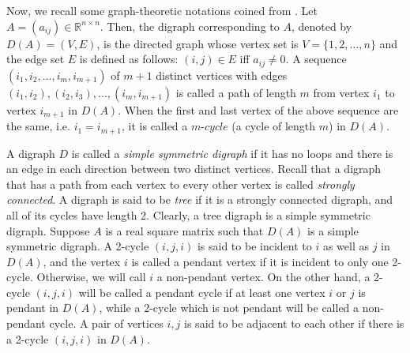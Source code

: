 \documentclass[notitlepage,12pt,reqno]{amsart}
\numberwithin{equation}{section}
\begin{document}
Now, we recall some graph-theoretic notations coined from \cite{cov}. Let $A=(a_{ij})\in \mathbb{R}^{n\times n}$. Then, the digraph corresponding to $A$, denoted by $D(A)=(V,E)$, is the directed graph whose vertex set is $V=\{1,2, \ldots ,n\}$ and the edge set $E$ is defined as follows: $(i,j)\in E$ iff $a_{ij}\neq 0$. A sequence $(i_1,i_2,\ldots ,i_m,i_{m+1})$ of $m+1$ distinct vertices with edges $(i_1,i_2),(i_2,i_3),\ldots ,(i_m,i_{m+1})$ is called a path of length $m$ from vertex $i_1$ to vertex $i_{m+1}$ in $D(A)$. When the first and last vertex of the above sequence are the same, i.e. $i_1=i_{m+1}$, it is called a $m$-$cycle$ (a cycle of length $m$) in $D(A)$. 

A digraph $D$ is called a {\it simple symmetric digraph} if it has no loops and there is an edge in each direction between two distinct vertices. Recall that a digraph that has a path from each vertex to every other vertex is called {\it strongly connected}. A digraph is said to be {\it tree} if it is a strongly connected digraph, and all of its cycles have length 2. Clearly, a tree digraph is a simple symmetric digraph. Suppose $A$ is a real square matrix such that $D(A)$ is a simple symmetric digraph. A 2-cycle $(i,j,i)$ is said to be incident to $i$ as well as $j$ in $D(A)$, and the vertex $i$ is called a pendant vertex if it is incident to only one 2-cycle. Otherwise, we will call $i$ a non-pendant vertex. On the other hand, a 2-cycle $(i,j,i)$ will be called a pendant cycle if at least one vertex $i$ or $j$ is pendant in $D(A)$, while a 2-cycle which is not pendant will be called a non-pendant cycle. A pair of vertices $i,j$ is said to be adjacent to each other if there is a 2-cycle $(i,j,i)$ in $D(A)$.
\end{document}
